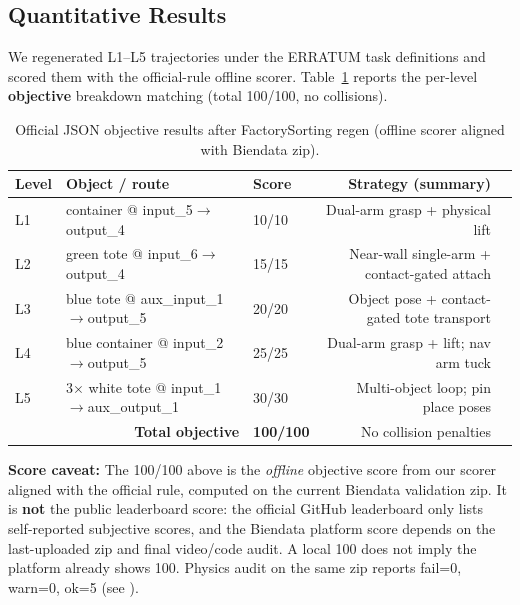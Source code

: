 \subsection{Quantitative Results}
\label{sec:experiments:results}

We regenerated L1--L5 trajectories under the ERRATUM task definitions and scored them with the official-rule offline scorer. Table~\ref{tab:results} reports the per-level \textbf{objective} breakdown matching  (total 100/100, no collisions).

\begin{table}[h]
\centering
\caption{Official JSON objective results after FactorySorting regen (offline scorer aligned with Biendata zip).}
\label{tab:results}
\small
\begin{tabular}{l l l r l}
\toprule
\textbf{Level} & \textbf{Object / route} & \textbf{Score} & \textbf{Strategy (summary)} \\
\midrule
L1 & container @ input\_5$\rightarrow$output\_4 & 10/10 & Dual-arm grasp + physical lift \\
L2 & green tote @ input\_6$\rightarrow$output\_4 & 15/15 & Near-wall single-arm + contact-gated attach \\
L3 & blue tote @ aux\_input\_1$\rightarrow$output\_5 & 20/20 & Object pose + contact-gated tote transport \\
L4 & blue container @ input\_2$\rightarrow$output\_5 & 25/25 & Dual-arm grasp + lift; nav arm tuck \\
L5 & 3$\times$ white tote @ input\_1$\rightarrow$aux\_output\_1 & 30/30 & Multi-object loop; pin place poses \\
\midrule
\multicolumn{2}{r}{\textbf{Total objective}} & \textbf{100/100} & No collision penalties \\
\bottomrule
\end{tabular}
\end{table}

\noindent\textbf{Score caveat:} The 100/100 above is the \emph{offline} objective score from our scorer aligned with the official  rule, computed on the current Biendata validation zip. It is \textbf{not} the public leaderboard score: the official GitHub leaderboard only lists self-reported subjective scores, and the Biendata platform score depends on the last-uploaded zip and final video/code audit. A local 100 does not imply the platform already shows 100. Physics audit on the same zip reports fail=0, warn=0, ok=5 (see ).


